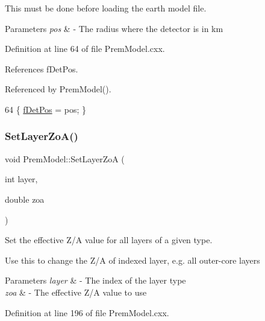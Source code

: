 This must be done before loading the earth model file.


\begin{DoxyParams}{Parameters}
{\em pos} & -\/ The radius where the detector is in km \\
\hline
\end{DoxyParams}


Definition at line 64 of file Prem\+Model.\+cxx.



References f\+Det\+Pos.



Referenced by Prem\+Model().


\begin{DoxyCode}
64 \{ \hyperlink{classOscProb_1_1PremModel_ab12ea0343cd11b9233ffd20ab5e620c7}{fDetPos} = pos; \}
\end{DoxyCode}
\mbox{\label{classOscProb_1_1PremModel_ac9887d1af4b3c02925fe3228349f593d}} 
\subsubsection{\texorpdfstring{Set\+Layer\+Zo\+A()}{SetLayerZoA()}}
{\footnotesize\ttfamily void Prem\+Model\+::\+Set\+Layer\+ZoA (\begin{DoxyParamCaption}\item[{int}]{layer,  }\item[{double}]{zoa }\end{DoxyParamCaption})\hspace{0.3cm}{\ttfamily [virtual]}}

Set the effective Z/A value for all layers of a given type.

Use this to change the Z/A of indexed layer, e.\+g. all outer-\/core layers


\begin{DoxyParams}{Parameters}
{\em layer} & -\/ The index of the layer type \\
\hline
{\em zoa} & -\/ The effective Z/A value to use \\
\hline
\end{DoxyParams}


Definition at line 196 of file Prem\+Model.\+cxx.



